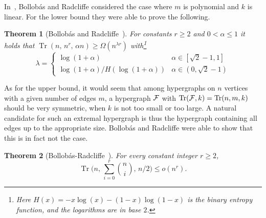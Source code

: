 \documentclass[11pt]{article}
\newtheorem{theo}{Theorem}[section]
\newcommand{\FF}{{\cal F}}
\renewcommand{\a}{\alpha}
\DeclareMathOperator{\trace}{Tr}
\begin{document}

In~\cite{BR}, Bollob\'as and Radcliffe considered the case where $m$ is polynomial and $k$ is linear. For the lower bound they were able to prove the following.
\begin{theo} [Bollob\'as and Radcliffe{~\cite[Theorem 7]{BR}}]
	\label{th:brlb}
	For constants $r\ge 2$ and $0 < \a \le 1$ it holds that $\trace(n,\,n^r,\,\a n) \ge \Omega(n^{\lambda r})$
	with\footnote{Here $H(x) = -x\log(x) - (1-x)\log(1-x)$ is the binary entropy function, and the logarithms are in base $2$.}
	$$\lambda =
	\begin{cases}
	\log(1+\alpha) & \alpha \in [\sqrt 2 -1, 1]\\
	\log(1+\alpha)/H(\log(1+\alpha)) & \alpha \in (0, \sqrt 2 -1)
	\end{cases}$$
\end{theo}

As for the upper bound, it would seem that among hypergraphs on $n$ vertices with a given number of edges $m$, a hypergraph $\FF$ with $\trace(\FF,k) = \trace(n,m,k)$ should be very symmetric, when $k$ is not too small or too large. A natural candidate for such an extremal hypergraph is thus the hypergraph containing all edges up to the appropriate size.
Bollob\'as and Radcliffe were able 
to show that this is in fact not the case. 
\begin {theo} [Bollob\'as-Radcliffe{~\cite[Theorem 11]{BR}}]
\label{th:brup}
For every constant integer $r \ge 2$, 
$$\trace\bigg(n,\, \sum_{i=0}^r \binom n i,\, n/2\bigg) \le o(n^r) .$$
\end {theo}

\end{document}
